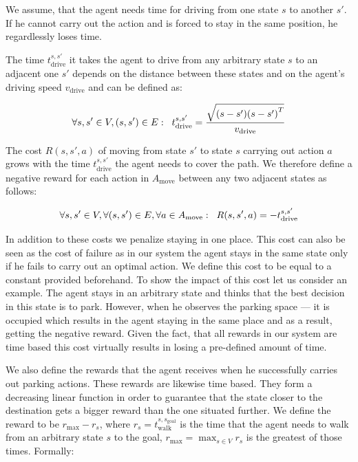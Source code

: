 We assume, that the agent needs time for driving from one state $s$ to another
$s'$. If he cannot carry out the action and is forced to stay in the same
position, he regardlessly loses time.

The time $t^{s, s'}_\mathrm{drive}$ it takes the agent to drive from any arbitrary state $s$ to an
adjacent one $s'$ depends on the distance between these states and on the
agent's driving speed $v_{\mathrm{drive}}$ and can be defined as:

\begin{equation}
\label{eq:time_to_drive}
\forall s,s' \in V, (s, s') \in E: \hspace{2mm} t_{\mathrm{drive}}^{s,s'}
= \frac{\sqrt{(s - s') {(s - s')}^T}}{v_{\mathrm{drive}}}
\end{equation}

The cost $R(s, s', a)$ of moving from state $s'$ to state $s$ carrying out
action $a$ grows with the time $t_{\mathrm{drive}}^{s,s'}$ the agent needs to
cover the path. We therefore define a negative reward for each action in
$A_{\mathrm{move}}$ between any two adjacent states as follows:

\begin{equation}
\label{eq:drive_reward}
\forall s,s' \in V, \forall (s, s') \in E, \forall a \in A_{\mathrm{move}}: \hspace{2mm} R(s, s', a) = -t_{\mathrm{drive}}^{s,s'}
\end{equation}

In addition to these costs we penalize staying in one place. This cost can
also be seen as the cost of failure as in our system the agent stays in the
same state only if he fails to carry out an optimal action. We define this
cost to be equal to a constant provided beforehand. To show the impact of this
cost let us consider an example. The agent stays in an arbitrary state and
thinks that the best decision in this state is to park. However, when he
observes the parking space --- it is occupied which results in the agent
staying in the same place and as a result, getting the negative reward. Given
the fact, that all rewards in our system are time based this cost virtually
results in losing a pre-defined amount of time.

We also define the rewards that the agent receives when he successfully
carries out parking actions. These rewards are likewise time based. They form
a decreasing linear function in order to guarantee that the state closer to
the destination gets a bigger reward than the one situated further. We define
the reward to be $r_{\max} - r_s$, where $r_s =
t_{\mathrm{walk}}^{s,s_{\mathrm{goal}}}$ is the time that the agent needs to
walk from an arbitrary state $s$ to the goal, $r_{\max} = \max_{s \in V}r_s$
is the greatest of those times. Formally:

